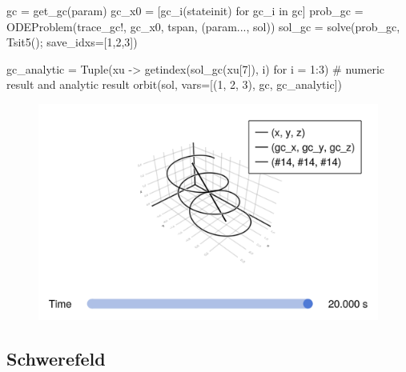 \documentclass[
  a4paper,
  DIV=11]{scrreprt}
\newenvironment{Shaded}{\begin{snugshade}}{\end{snugshade}}
\newcommand{\CommentTok}[1]{\textcolor[rgb]{0.37,0.37,0.37}{#1}}
\newcommand{\ControlFlowTok}[1]{\textcolor[rgb]{0.00,0.23,0.31}{#1}}
\newcommand{\FloatTok}[1]{\textcolor[rgb]{0.68,0.00,0.00}{#1}}
\newcommand{\FunctionTok}[1]{\textcolor[rgb]{0.28,0.35,0.67}{#1}}
\newcommand{\KeywordTok}[1]{\textcolor[rgb]{0.00,0.23,0.31}{#1}}
\newcommand{\NormalTok}[1]{\textcolor[rgb]{0.00,0.23,0.31}{#1}}
\newcommand{\OperatorTok}[1]{\textcolor[rgb]{0.37,0.37,0.37}{#1}}
\begin{document}
\begin{Shaded}
\begin{Highlighting}[]
\NormalTok{gc }\OperatorTok{=} \FunctionTok{get\_gc}\NormalTok{(param)}
\NormalTok{gc\_x0 }\OperatorTok{=}\NormalTok{ [}\FunctionTok{gc\_i}\NormalTok{(stateinit) for gc\_i }\KeywordTok{in}\NormalTok{ gc]}
\NormalTok{prob\_gc }\OperatorTok{=} \FunctionTok{ODEProblem}\NormalTok{(trace\_gc!, gc\_x0, tspan, (param}\OperatorTok{...}\NormalTok{, sol))}
\NormalTok{sol\_gc }\OperatorTok{=} \FunctionTok{solve}\NormalTok{(prob\_gc, }\FunctionTok{Tsit5}\NormalTok{(); save\_idxs}\OperatorTok{=}\NormalTok{[}\FloatTok{1}\NormalTok{,}\FloatTok{2}\NormalTok{,}\FloatTok{3}\NormalTok{])}

\NormalTok{gc\_analytic }\OperatorTok{=} \FunctionTok{Tuple}\NormalTok{(xu }\OperatorTok{{-}\textgreater{}} \FunctionTok{getindex}\NormalTok{(}\FunctionTok{sol\_gc}\NormalTok{(xu[}\FloatTok{7}\NormalTok{]), i) }\ControlFlowTok{for}\NormalTok{ i }\OperatorTok{=} \FloatTok{1}\OperatorTok{:}\FloatTok{3}\NormalTok{)}
\CommentTok{\# numeric result and analytic result}
\FunctionTok{orbit}\NormalTok{(sol, vars}\OperatorTok{=}\NormalTok{[(}\FloatTok{1}\NormalTok{, }\FloatTok{2}\NormalTok{, }\FloatTok{3}\NormalTok{), gc, gc\_analytic])}
\end{Highlighting}
\end{Shaded}

\begin{figure}[H]

{\centering \includegraphics{./Tutorial_files/figure-pdf/cell-5-output-1.png}

}

\end{figure}

\hypertarget{schwerefeld}{%
\subsection{Schwerefeld}\label{schwerefeld}}
\end{document}
